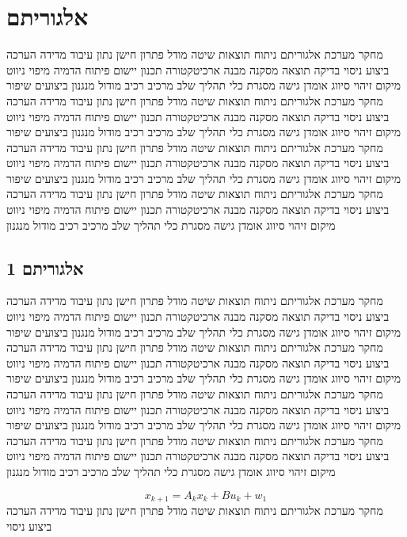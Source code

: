 \section{אלגוריתם}
\label{sec:ch06}

מחקר מערכת אלגוריתם ניתוח תוצאות שיטה מודל פתרון חישן נתון עיבוד מדידה הערכה ביצוע ניסוי בדיקה תוצאה מסקנה מבנה ארכיטקטורה תכנון יישום פיתוח הדמיה מיפוי ניווט מיקום זיהוי סיווג אומדן גישה מסגרת כלי תהליך שלב מרכיב רכיב מודול מנגנון ביצועים שיפור מחקר מערכת אלגוריתם ניתוח תוצאות שיטה מודל פתרון חישן נתון עיבוד מדידה הערכה ביצוע ניסוי בדיקה תוצאה מסקנה מבנה ארכיטקטורה תכנון יישום פיתוח הדמיה מיפוי ניווט מיקום זיהוי סיווג אומדן גישה מסגרת כלי תהליך שלב מרכיב רכיב מודול מנגנון ביצועים שיפור מחקר מערכת אלגוריתם ניתוח תוצאות שיטה מודל פתרון חישן נתון עיבוד מדידה הערכה ביצוע ניסוי בדיקה תוצאה מסקנה מבנה ארכיטקטורה תכנון יישום פיתוח הדמיה מיפוי ניווט מיקום זיהוי סיווג אומדן גישה מסגרת כלי תהליך שלב מרכיב רכיב מודול מנגנון ביצועים שיפור מחקר מערכת אלגוריתם ניתוח תוצאות שיטה מודל פתרון חישן נתון עיבוד מדידה הערכה ביצוע ניסוי בדיקה תוצאה מסקנה מבנה ארכיטקטורה תכנון יישום פיתוח הדמיה מיפוי ניווט מיקום זיהוי סיווג אומדן גישה מסגרת כלי תהליך שלב מרכיב רכיב מודול מנגנון

\subsection{אלגוריתם 1}
\label{sub:ch06_1}
מחקר מערכת אלגוריתם ניתוח תוצאות שיטה מודל פתרון חישן נתון עיבוד מדידה הערכה ביצוע ניסוי בדיקה תוצאה מסקנה מבנה ארכיטקטורה תכנון יישום פיתוח הדמיה מיפוי ניווט מיקום זיהוי סיווג אומדן גישה מסגרת כלי תהליך שלב מרכיב רכיב מודול מנגנון ביצועים שיפור מחקר מערכת אלגוריתם ניתוח תוצאות שיטה מודל פתרון חישן נתון עיבוד מדידה הערכה ביצוע ניסוי בדיקה תוצאה מסקנה מבנה ארכיטקטורה תכנון יישום פיתוח הדמיה מיפוי ניווט מיקום זיהוי סיווג אומדן גישה מסגרת כלי תהליך שלב מרכיב רכיב מודול מנגנון ביצועים שיפור מחקר מערכת אלגוריתם ניתוח תוצאות שיטה מודל פתרון חישן נתון עיבוד מדידה הערכה ביצוע ניסוי בדיקה תוצאה מסקנה מבנה ארכיטקטורה תכנון יישום פיתוח הדמיה מיפוי ניווט מיקום זיהוי סיווג אומדן גישה מסגרת כלי תהליך שלב מרכיב רכיב מודול מנגנון ביצועים שיפור מחקר מערכת אלגוריתם ניתוח תוצאות שיטה מודל פתרון חישן נתון עיבוד מדידה הערכה ביצוע ניסוי בדיקה תוצאה מסקנה מבנה ארכיטקטורה תכנון יישום פיתוח הדמיה מיפוי ניווט מיקום זיהוי סיווג אומדן גישה מסגרת כלי תהליך שלב מרכיב רכיב מודול מנגנון

\begin{equation}
    x_{k+1} = A_{k} x_k + B u_{k} + w_{1}
    \label{eq:ch06_1}
\end{equation}
מחקר מערכת אלגוריתם ניתוח תוצאות שיטה מודל פתרון חישן נתון עיבוד מדידה הערכה ביצוע ניסוי

